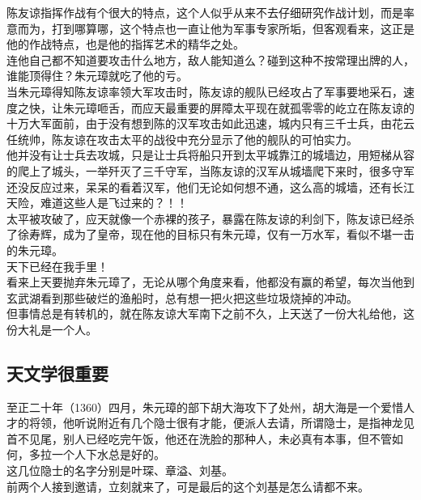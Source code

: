 \begin{multicols}{\theparacolNo}
陈友谅指挥作战有个很大的特点，这个人似乎从来不去仔细研究作战计划，而是率意而为，打到哪算哪，这个特点也一直让他为军事专家所垢，但客观看来，这正是他的作战特点，也是他的指挥艺术的精华之处。\\

连他自己都不知道要攻击什么地方，敌人能知道么？碰到这种不按常理出牌的人，谁能顶得住？朱元璋就吃了他的亏。\\

当朱元璋得知陈友谅率领大军攻击时，陈友谅的舰队已经攻占了军事要地采石，速度之快，让朱元璋咂舌，而应天最重要的屏障太平现在就孤零零的屹立在陈友谅的十万大军面前，由于没有想到陈的汉军攻击如此迅速，城内只有三千士兵，由花云任统帅，陈友谅在攻击太平的战役中充分显示了他的舰队的可怕实力。\\

他并没有让士兵去攻城，只是让士兵将船只开到太平城靠江的城墙边，用短梯从容的爬上了城头，一举歼灭了三千守军，当陈友谅的汉军从城墙爬下来时，很多守军还没反应过来，呆呆的看着汉军，他们无论如何想不通，这么高的城墙，还有长江天险，难道这些人是飞过来的？！！\\

太平被攻破了，应天就像一个赤裸的孩子，暴露在陈友谅的利剑下，陈友谅已经杀了徐寿辉，成为了皇帝，现在他的目标只有朱元璋，仅有一万水军，看似不堪一击的朱元璋。\\

天下已经在我手里！\\

看来上天要抛弃朱元璋了，无论从哪个角度来看，他都没有赢的希望，每次当他到玄武湖看到那些破烂的渔船时，总有想一把火把这些垃圾烧掉的冲动。\\

但事情总是有转机的，就在陈友谅大军南下之前不久，上天送了一份大礼给他，这份大礼是一个人。\\

\subsection{天文学很重要}
至正二十年（1360）四月，朱元璋的部下胡大海攻下了处州，胡大海是一个爱惜人才的将领，他听说附近有几个隐士很有才能，便派人去请，所谓隐士，是指神龙见首不见尾，别人已经吃完午饭，他还在洗脸的那种人，未必真有本事，但不管如何，多拉一个人下水总是好的。\\

这几位隐士的名字分别是叶琛、章溢、刘基。\\

前两个人接到邀请，立刻就来了，可是最后的这个刘基是怎么请都不来。\\


\end{multicols}
